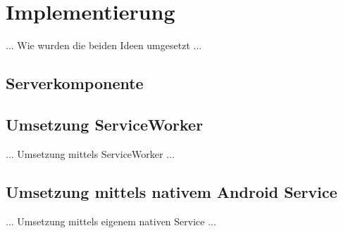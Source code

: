 \chapter{Implementierung}

... Wie wurden die beiden Ideen umgesetzt ...

\section{Serverkomponente}

\section{Umsetzung ServiceWorker}

... Umsetzung mittels ServiceWorker ...

\section{Umsetzung mittels nativem Android Service}

... Umsetzung mittels eigenem nativen Service ...
